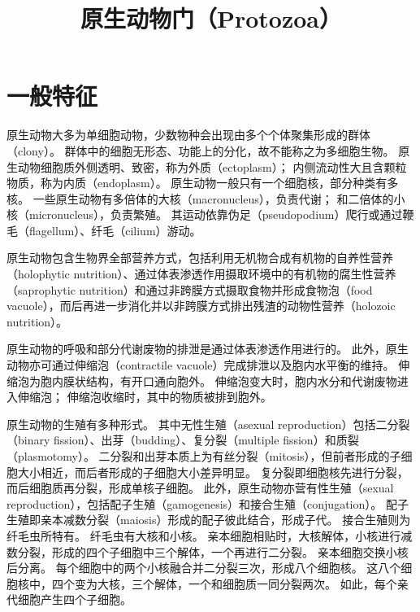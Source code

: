 \documentclass[11pt]{article}
\title{原生动物门（Protozoa）}
\date{}
\begin{document}
  \maketitle

  \linenumbers

\section{一般特征}
原生动物大多为单细胞动物，少数物种会出现由多个个体聚集形成的群体（clony）。
群体中的细胞无形态、功能上的分化，故不能称之为多细胞生物。
原生动物细胞质外侧透明、致密，称为外质（ectoplasm）；
内侧流动性大且含颗粒物质，称为内质（endoplasm）。
原生动物一般只有一个细胞核，部分种类有多核。
一些原生动物有多倍体的大核（macronucleus），负责代谢；
和二倍体的小核（micronucleus），负责繁殖。
其运动依靠伪足（pseudopodium）爬行或通过鞭毛（flagellum）、纤毛（cilium）游动。

\newline

原生动物包含生物界全部营养方式，包括利用无机物合成有机物的自养性营养（holophytic nutrition）、通过体表渗透作用摄取环境中的有机物的腐生性营养（saprophytic nutrition）和通过非跨膜方式摄取食物并形成食物泡（food vacuole），而后再进一步消化并以非跨膜方式排出残渣的动物性营养（holozoic nutrition）。

\newline

原生动物的呼吸和部分代谢废物的排泄是通过体表渗透作用进行的。
此外，原生动物亦可通过伸缩泡（contractile vacuole）完成排泄以及胞内水平衡的维持。
伸缩泡为胞内膜状结构，有开口通向胞外。
伸缩泡变大时，胞内水分和代谢废物进入伸缩泡；
伸缩泡收缩时，其中的物质被排到胞外。

\newline

原生动物的生殖有多种形式。
其中无性生殖（asexual reproduction）包括二分裂（binary fission）、出芽（budding）、复分裂（multiple fission）和质裂（plasmotomy）。
二分裂和出芽本质上为有丝分裂（mitosis），但前者形成的子细胞大小相近，而后者形成的子细胞大小差异明显。
复分裂即细胞核先进行分裂，而后细胞质再分裂，形成单核子细胞。
此外，原生动物亦营有性生殖（sexual reproduction），包括配子生殖（gamogenesis）和接合生殖（conjugation）。
配子生殖即亲本减数分裂（maiosis）形成的配子彼此结合，形成子代。
接合生殖则为纤毛虫所特有。
纤毛虫有大核和小核。
亲本细胞相贴时，大核解体，小核进行减数分裂，形成的四个子细胞中三个解体，一个再进行二分裂。
亲本细胞交换小核后分离。
每个细胞中的两个小核融合并二分裂三次，形成八个细胞核。
这八个细胞核中，四个变为大核，三个解体，一个和细胞质一同分裂两次。
如此，每个亲代细胞产生四个子细胞。
\end{document}
